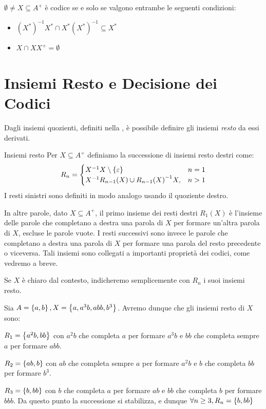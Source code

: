 \begin{corollary}{}
  \(\emptyset \neq X \subseteq A^+\) è codice se e solo se valgono entrambe le seguenti condizioni:
  \begin{itemize}
    \item \({(X^*)}^{-1}X^* \cap X^*{(X^*)}^{-1} \subseteq X^* \)
    \item \(X \cap XX^+ = \emptyset\)
  \end{itemize}
\end{corollary}

\section{Insiemi Resto e Decisione dei Codici}

Dagli insiemi quozienti, definiti nella , è possibile definire gli insiemi \emph{resto} da essi derivati.
\begin{definition}[namedlabel={def:remainder}{Insiemi resto}]{Insiemi resto}
  Per \(X \subseteq A^+\) definiamo la successione di insiemi resto destri come:
  \begin{equation}
    R_n=\begin{cases}
      X^{-1}X\setminus \set{\varepsilon} & n = 1\\
      X^{-1} R_{n-1}(X) \cup {R_{n-1}(X)}^{-1}X, & n > 1\\
    \end{cases}
  \end{equation}
  I resti sinistri sono definiti in modo analogo usando il quoziente destro.
\end{definition}

In altre parole, dato \(X \subseteq A^+\), il primo insieme dei resti destri \(R_1(X)\) è l'insieme delle parole che completano a destra una parola di \(X\) per formare un'altra parola di \(X\), escluse le parole vuote.
I resti successivi sono invece le parole che completano a destra una parola di \(X\) per formare una parola del resto precedente o viceversa.
Tali insiemi sono collegati a importanti proprietà dei codici, come vedremo a breve.
\begin{note}{}
  Se \(X\) è chiaro dal contesto, indicheremo semplicemente con \(R_n\) i suoi insiemi resto.
\end{note}

\begin{example}{}
  Sia \(A = \set{a,b}, X = \set{a,a^3b,abb,b^3}\).
  Avremo dunque che gli insiemi resto di \(X\) sono:

  \(R_1 = \set{a^2b, bb}\)
  con \(a^2b\) che completa \(a\) per formare \(a^3b\) e \(bb\) che completa sempre \(a\) per formare \(abb\).

  \(R_2 = \set{ab,b}\)
  con \(ab\) che completa sempre \(a\) per formare \(a^2b\) e \(b\) che completa \(bb\) per formare \(b^3\).

  \(R_3 = \set{b,bb}\)
  con \(b\) che completa \(a\) per formare \(ab\) e \(bb\) che completa \(b\) per formare \(bbb\).
  Da questo punto la successione si stabilizza, e dunque \(\forall n \geq 3, R_n = \set{b,bb}\)
\end{example}

